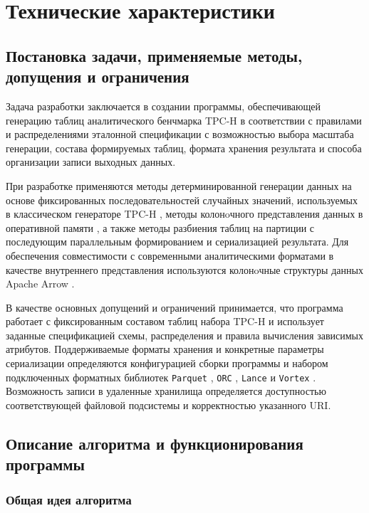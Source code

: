 \section{Технические характеристики}

\subsection{Постановка задачи, применяемые методы, допущения и ограничения}

Задача разработки заключается в создании программы, обеспечивающей генерацию
таблиц аналитического бенчмарка TPC-H  в соответствии с правилами и
распределениями эталонной спецификации с возможностью выбора масштаба
генерации, состава формируемых таблиц, формата хранения результата и способа
организации записи выходных данных.

При разработке применяются методы детерминированной генерации данных на основе
фиксированных последовательностей случайных значений, используемых в
классическом генераторе TPC-H , методы колонoчного представления
данных в оперативной памяти , а также методы разбиения таблиц на
партиции с
последующим параллельным формированием и сериализацией результата. Для
обеспечения совместимости с современными аналитическими форматами в качестве
внутреннего представления используются колонoчные структуры данных Apache
Arrow .

В качестве основных допущений и ограничений принимается, что программа работает
с фиксированным составом таблиц набора TPC-H и использует заданные спецификацией
схемы, распределения и правила вычисления зависимых атрибутов. Поддерживаемые
форматы хранения и конкретные параметры сериализации определяются конфигурацией
сборки программы и набором подключенных форматных библиотек \texttt{Parquet}
, \texttt{ORC} , \texttt{Lance}  и
\texttt{Vortex} .
Возможность записи в удаленные хранилища определяется доступностью
соответствующей файловой подсистемы и корректностью указанного URI.

\subsection{Описание алгоритма и функционирования программы}

\subsubsection{Общая идея алгоритма}

